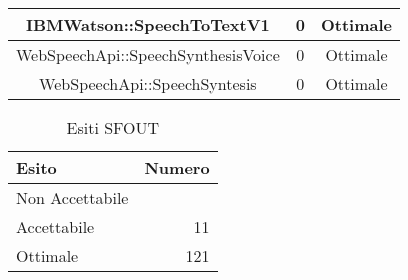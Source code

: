\begin{longtable}{|c|c|c|}
\hline IBMWatson::SpeechToTextV1 & 0 & Ottimale \\
\hline WebSpeechApi::SpeechSynthesisVoice & 0 & Ottimale \\
\hline WebSpeechApi::SpeechSyntesis & 0 & Ottimale \\
\hline \end{longtable}\begin{table}[h]
\centering
\begin{tabular}{l r}
	\hline
	\rule[-0.3cm]{0cm}{0.8cm}
	\textbf{Esito} & \textbf{Numero} \\
	\hline
	\rule[0cm]{0cm}{0.4cm}
	Non Accettabile &  \\
	\rule[0cm]{0cm}{0.4cm}
	Accettabile & 11 \\
	\rule[0cm]{0cm}{0.4cm}
	Ottimale & 121 \\
	\hline
\end{tabular}
\caption{Esiti SFOUT}
\end{table}